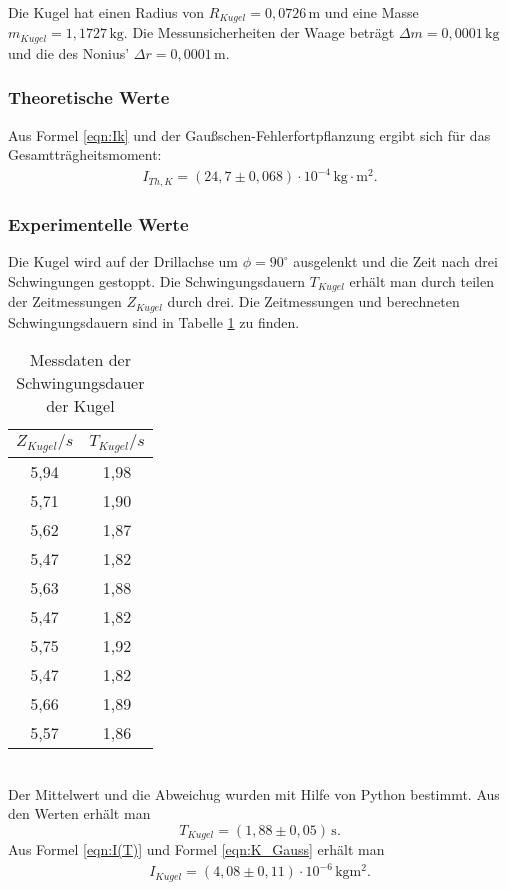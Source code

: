 Die Kugel hat einen Radius von $R_{Kugel} = 0{,}0726\,\mathrm{m} $ und eine Masse $m_{Kugel} = 1{,}1727 \,\mathrm{kg} $.
Die Messunsicherheiten der Waage beträgt $\Delta m = 0,0001\, \mathrm{kg}$ und die des Nonius' $\Delta r = 0,0001\, \mathrm{m}$.

\label{sec:TraegheitsmomentderKugel}

\subsubsection{Theoretische Werte}

Aus Formel \ref{eqn:Ik} und der Gaußschen-Fehlerfortpflanzung ergibt sich für das Gesamtträgheitsmoment:
\begin{align*}
  I_{Th, K} = \left(24{,}7 \pm 0{,}068 \right) \cdot 10^{-4} \, \mathrm{kg}\cdot\mathrm{m^2}.
\end{align*}

\subsubsection{Experimentelle Werte}
Die Kugel wird auf der Drillachse um $\phi = 90^{\circ}$ ausgelenkt und die Zeit nach drei
Schwingungen gestoppt. Die Schwingungsdauern $T_{Kugel}$ erhält man durch teilen der Zeitmessungen
$Z_{Kugel}$ durch drei. Die Zeitmessungen und berechneten Schwingungsdauern sind in
Tabelle \ref{tab:T_Kugel} zu finden.
\begin{table}
  \centering
  \caption{Messdaten der Schwingungsdauer der Kugel}
  \label{tab:T_Kugel}
  \begin{tabular}{c c}
    \toprule
    $Z_{Kugel}/s$ & $T_{Kugel}/s$ \\
    \midrule
    5,94 & 1,98 \\
    5,71 & 1,90 \\
    5,62 & 1,87 \\
    5,47 & 1,82 \\
    5,63 & 1,88 \\
    5,47 & 1,82 \\
    5,75 & 1,92 \\
    5,47 & 1,82 \\
    5,66 & 1,89 \\
    5,57 & 1,86 \\
    \bottomrule
  \end{tabular}
\end{table}
\\
Der Mittelwert und die Abweichug wurden mit Hilfe von Python bestimmt. Aus den Werten erhält man
\begin{equation}
  T_{Kugel} = (1{,}88 \pm 0{,}05)\, \mathrm{s} .
\end{equation}
Aus Formel \ref{eqn:I(T)} und Formel \ref{eqn:K_Gauss} erhält man
\begin{align*}
  I_{Kugel} = (4{,}08 \pm 0{,}11)\cdot 10^{-6}\, \mathrm{kgm^2}.
\end{align*}

